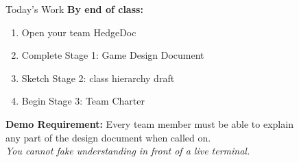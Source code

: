 \documentclass{beamer}
\begin{document}
\begin{frame}{Today's Work}
\textbf{By end of class:}
\vspace{0.2cm}
\begin{enumerate}
  \item Open your team HedgeDoc
  \item Complete Stage 1: Game Design Document
  \item Sketch Stage 2: class hierarchy draft
  \item Begin Stage 3: Team Charter
\end{enumerate}
\vspace{0.3cm}
\textbf{Demo Requirement:} Every team member must be able to explain\\
any part of the design document when called on.\\
\vspace{0.3cm}
\textit{You cannot fake understanding in front of a live terminal.}
\end{frame}
\end{document}

